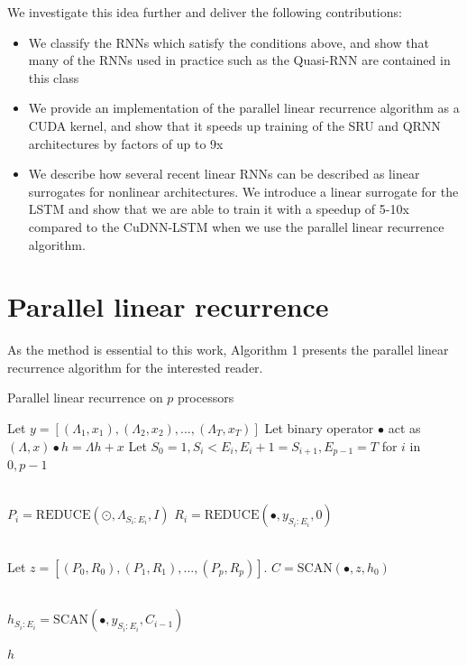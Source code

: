 \documentclass{article}
\providecommand{\scan}{\text{SCAN}}
\providecommand{\reduce}{\text{REDUCE}}
\begin{document}
We investigate this idea further and deliver the following contributions:
\begin{itemize}
\item{We classify the RNNs which satisfy the conditions above, and
    show that many of the RNNs used in practice such as the Quasi-RNN are
    contained in this class}
\item{We provide an implementation of the parallel linear recurrence
    algorithm as a CUDA kernel, and show that it speeds up training of
    the SRU and QRNN architectures by factors of up to 9x}
\item{We describe how several recent linear RNNs can be described as
    linear surrogates for nonlinear architectures. We introduce a linear
    surrogate for the LSTM and show that we are able to train it
    with a speedup of 5-10x compared to the CuDNN-LSTM when we use the
    parallel linear recurrence algorithm.}
\end{itemize}

\section{Parallel linear recurrence}
As the method is
essential to this work, Algorithm 1 presents the parallel linear recurrence
algorithm for the interested reader.
\begin{algorithm}
  \label{alg:plr}
\caption{Parallel linear recurrence on $p$ processors}
\begin{algorithmic}[1]
  \State Let $y = [(\Lambda_1, x_1), (\Lambda_2, x_2), ..., (\Lambda_T, x_T)]$
  \State Let binary operator $\bullet$ act as $(\Lambda, x) \bullet h = \Lambda h + x$
  \State Let $S_0=1, S_i < E_i, E_i + 1 = S_{i+1}, E_{p-1}=T$ for $i$ in $0,p-1$

  \\
    \State $P_i = \reduce(\odot, \Lambda_{S_i:E_i}, I)$
    \State $R_i = \reduce(\bullet, y_{S_i:E_i}, 0)$
  \EndParFor

  \\
  \State Let $z = [(P_0, R_0), (P_1, R_1), ..., (P_p, R_p)]$.
  \State $C = \scan(\bullet, z, h_0)$   

  \\
    \State $h_{S_i:E_i} = \scan(\bullet, y_{S_i:E_i}, C_{i-1})$
  \EndParFor
  
  \State \Return $h$
\end{algorithmic}
\end{algorithm}
\end{document}
